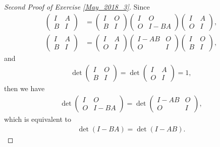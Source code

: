 \documentclass[11pt]{article}
\theoremstyle{definition}
\numberwithin{equation}{subsection}
\begin{document}
\begin{proof}[Second Proof of Exercise \ref{May_2018_3}]
Since 
\begin{align*}
    \begin{pmatrix} I & A \\ B & I \end{pmatrix} & = \begin{pmatrix} I & O \\ B & I \end{pmatrix} \begin{pmatrix} I & O \\ O & I - BA \end{pmatrix} \begin{pmatrix} I & A \\ O & I \end{pmatrix}, \\
    \begin{pmatrix} I & A \\ B & I \end{pmatrix} & = \begin{pmatrix} I & A \\ O & I \end{pmatrix} \begin{pmatrix} I - AB & O \\ O & I \end{pmatrix} \begin{pmatrix} I & O \\ B & I \end{pmatrix},
\end{align*}
and 
\begin{align*}
    \det \begin{pmatrix} I & O \\ B & I \end{pmatrix} = \det \begin{pmatrix} I & A \\ O & I \end{pmatrix} = 1,
\end{align*}
then we have
\begin{align*}
    \det \begin{pmatrix} I & O \\ O & I - BA \end{pmatrix} = \det \begin{pmatrix} I - AB & O \\ O & I \end{pmatrix},
\end{align*}
which is equivalent to
\begin{align*}
    \det (I - BA) = \det (I - AB).
\end{align*}
\end{proof}
\end{document}
